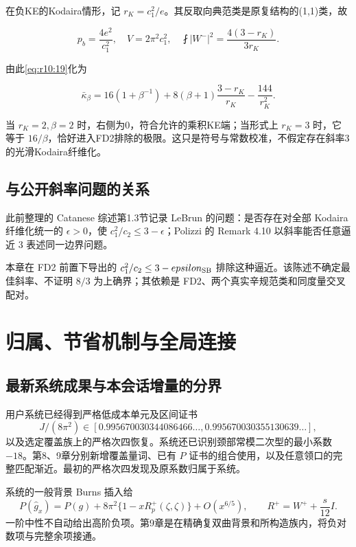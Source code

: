 \documentclass[UTF8,11pt,openany,oneside,fontset=none]{ctexbook}
\begin{document}
在负KE的Kodaira情形，记 \(r_K=c_1^2/e\)。其反取向典范类是原复结构的(1,1)类，故

\[
p_b=\frac{4e^2}{c_1^2},\quad
V=2\pi^2 c_1^2,\quad
\fint|W^-|^2=\frac{4(3-r_K)}{3r_K}.
\]

由此\eqref{eq:r10:19}化为

\[
\bar\kappa_\beta
=16(1+\beta^{-1})
+8(\beta+1)\frac{3-r_K}{r_K}
-\frac{144}{r_K^2}.
\tag{10.23}\label{eq:r10:23}
\]

当 \(r_K=2,\beta=2\) 时，右侧为0，符合允许的乘积KE端；当形式上 \(r_K=3\) 时，它等于 \(16/\beta\)，恰好进入FD2排除的极限。这只是符号与常数校准，不假定存在斜率3的光滑Kodaira纤维化。

\section{与公开斜率问题的关系}\label{ch10:ux4e0eux516cux5f00ux659cux7387ux95eeux9898ux7684ux5173ux7cfb}

此前整理的 Catanese 综述第1.3节记录 LeBrun 的问题：是否存在对全部 Kodaira 纤维化统一的 \(\epsilon>0\)，使 \(c_1^2/c_2\le3-\epsilon\)；Polizzi 的 Remark 4.10 以斜率能否任意逼近 \(3\) 表述同一边界问题。\cite{Catanese2016,Polizzi2022}

本章在 FD2 前置下导出的 \(c_1^2/c_2\le3-\varepsilon_{\rm SB}\) 排除这种逼近。该陈述不确定最佳斜率、不证明 \(8/3\) 为上确界；其依赖是 FD2、两个真实辛规范类和同度量交叉配对。


\chapter{归属、节省机制与全局连接}\label{chapter:11}
\section{最新系统成果与本会话增量的分界}\label{ch11:ux6700ux65b0ux7cfbux7edfux6210ux679cux4e0eux672cux4f1aux8bddux589eux91cfux7684ux5206ux754c}

用户系统已经得到严格低成本单元及区间证书 \[
J/(8\pi^2)\in[0.995670030344086466\ldots,
0.995670030355130639\ldots],
\] 以及选定覆盖族上的严格次四恢复。系统还已识别颈部常模二次型的最小系数 \(-18\)。第8、9章分别新增覆盖量词、已有 \(P\) 证书的组合使用，以及任意领口的完整匹配渐近。最初的严格次四发现及原系数归属于系统。\cite{System,CellSource,R08,R09}

系统的一般背景 Burns 插入给 \[
P(\hat g_x)=P(g)+8\pi^2\{1-xR_p^+(\zeta,\zeta)\}+O(x^{6/5}),
\qquad R^+=W^++\frac{s}{12}I.
\] 一阶中性不自动给出高阶负项。第9章是在精确复双曲背景和所构造族内，将负对数项与完整余项接通。
\end{document}
